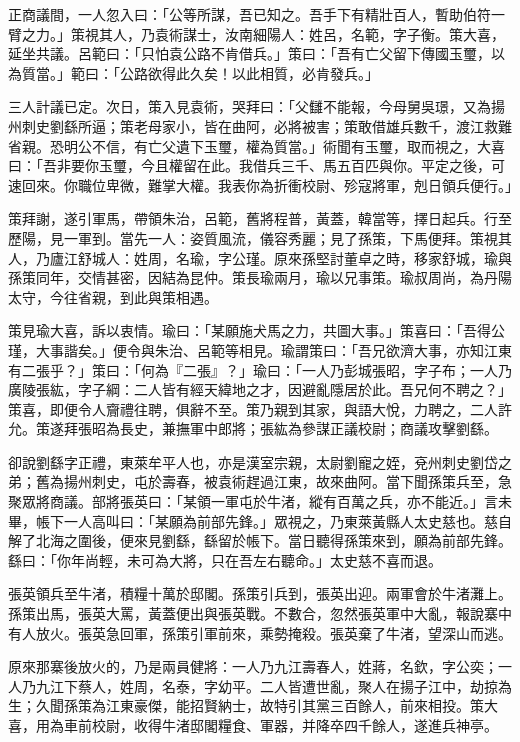 正商議間，一人忽入曰：「公等所謀，吾已知之。吾手下有精壯百人，暫助伯符一臂之力。」策視其人，乃袁術謀士，汝南細陽人：姓呂，名範，字子衡。策大喜，延坐共議。呂範曰：「只怕袁公路不肯借兵。」策曰：「吾有亡父留下傳國玉璽，以為質當。」範曰：「公路欲得此久矣！以此相質，必肯發兵。」

三人計議已定。次日，策入見袁術，哭拜曰：「父讎不能報，今母舅吳璟，又為揚州刺史劉繇所逼；策老母家小，皆在曲阿，必將被害；策敢借雄兵數千，渡江救難省親。恐明公不信，有亡父遺下玉璽，權為質當。」術聞有玉璽，取而視之，大喜曰：「吾非要你玉璽，今且權留在此。我借兵三千、馬五百匹與你。平定之後，可速回來。你職位卑微，難掌大權。我表你為折衝校尉、殄寇將軍，剋日領兵便行。」

策拜謝，遂引軍馬，帶領朱治，呂範，舊將程普，黃蓋，韓當等，擇日起兵。行至歷陽，見一軍到。當先一人：姿質風流，儀容秀麗；見了孫策，下馬便拜。策視其人，乃廬江舒城人：姓周，名瑜，字公瑾。原來孫堅討董卓之時，移家舒城，瑜與孫策同年，交情甚密，因結為昆仲。策長瑜兩月，瑜以兄事策。瑜叔周尚，為丹陽太守，今往省親，到此與策相遇。

策見瑜大喜，訴以衷情。瑜曰：「某願施犬馬之力，共圖大事。」策喜曰：「吾得公瑾，大事諧矣。」便令與朱治、呂範等相見。瑜謂策曰：「吾兄欲濟大事，亦知江東有二張乎？」策曰：「何為『二張』？」瑜曰：「一人乃彭城張昭，字子布；一人乃廣陵張紘，字子綱：二人皆有經天緯地之才，因避亂隱居於此。吾兄何不聘之？」策喜，即便令人齎禮往聘，俱辭不至。策乃親到其家，與語大悅，力聘之，二人許允。策遂拜張昭為長史，兼撫軍中郎將；張紘為參謀正議校尉；商議攻擊劉繇。

卻說劉繇字正禮，東萊牟平人也，亦是漢室宗親，太尉劉寵之姪，兗州刺史劉岱之弟；舊為揚州刺史，屯於壽春，被袁術趕過江東，故來曲阿。當下聞孫策兵至，急聚眾將商議。部將張英曰：「某領一軍屯於牛渚，縱有百萬之兵，亦不能近。」言未畢，帳下一人高叫曰：「某願為前部先鋒。」眾視之，乃東萊黃縣人太史慈也。慈自解了北海之圍後，便來見劉繇，繇留於帳下。當日聽得孫策來到，願為前部先鋒。繇曰：「你年尚輕，未可為大將，只在吾左右聽命。」太史慈不喜而退。

張英領兵至牛渚，積糧十萬於邸閣。孫策引兵到，張英出迎。兩軍會於牛渚灘上。孫策出馬，張英大罵，黃蓋便出與張英戰。不數合，忽然張英軍中大亂，報說寨中有人放火。張英急回軍，孫策引軍前來，乘勢掩殺。張英棄了牛渚，望深山而逃。

原來那寨後放火的，乃是兩員健將：一人乃九江壽春人，姓蔣，名欽，字公奕；一人乃九江下蔡人，姓周，名泰，字幼平。二人皆遭世亂，聚人在揚子江中，劫掠為生；久聞孫策為江東豪傑，能招賢納士，故特引其黨三百餘人，前來相投。策大喜，用為車前校尉，收得牛渚邸閣糧食、軍器，并降卒四千餘人，遂進兵神亭。


